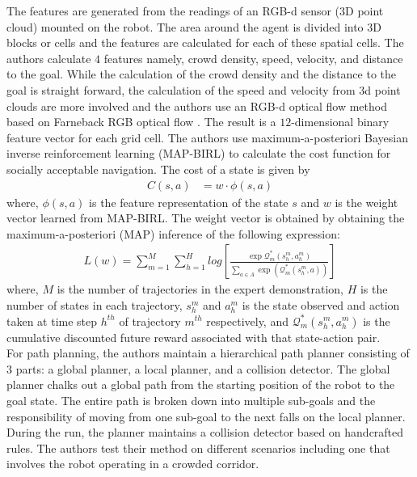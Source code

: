 The features are generated from the readings of an RGB-d sensor ($3$D point cloud) mounted on the robot. The area around the agent is divided into $3$D blocks or cells and the features are calculated for each of these spatial cells. 
The authors calculate $4$ features namely,
crowd density, speed, velocity, and distance to the goal.
While the calculation of the crowd density and the distance to the goal is straight forward, the calculation of the speed and velocity from 3d point clouds are more involved and the authors use an RGB-d optical flow method based on Farneback RGB optical flow \cite{farneback_optical_flow}. 
The result is a $12$-dimensional binary feature vector for each grid cell.
The authors use maximum-a-posteriori Bayesian inverse reinforcement learning (MAP-BIRL) \cite{choi_MAP-BIRL_2011} to calculate the cost function for socially acceptable navigation. The cost of a state is given by
\begin{align}
C(s,a) &=w \cdot \phi(s,a)
\end{align}
where, $\phi(s,a)$ is the feature representation of the state $s$ and $w$ is the weight vector learned from MAP-BIRL. 
The weight vector is obtained by obtaining the maximum-a-posteriori (MAP) inference of the following expression:
\begin{align}
L(w) = \sum^M_{m=1} \sum^{H}_{h=1}log[\frac{\exp \mathcal{Q}^{*}_m(s^m_h, a^m_h)}{\sum_{a\in A} \exp(\mathcal{Q}_m^*(s_h^m,a))}]
\end{align}
where, $M$ is the number of trajectories in the expert demonstration, $H$ is the number of states in each trajectory, $s_{h}^{m}$ and  $a_{h}^{m}$ is the state observed and action taken at time step $h^{th}$ of trajectory $m^{th}$ respectively, and $\mathcal{Q}^{*}_m(s^m_h, a^m_h)$ is the cumulative discounted future reward associated with that state-action pair.\\ 
For path planning, the authors maintain a hierarchical path planner consisting of 3 parts: a global planner, a local planner, and a collision detector.
The global planner chalks out a global path from the starting position of the robot to the goal state. The entire path is broken down into multiple sub-goals and the responsibility of moving from one sub-goal to the next falls on the local planner. During the run, the planner maintains a collision detector based on handcrafted rules.
The authors test their method on different scenarios including one that involves the robot operating in a crowded corridor.\\


